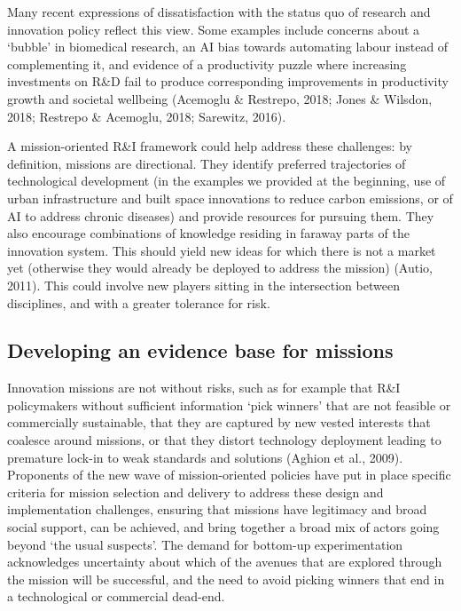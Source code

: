 \documentclass[11pt]{article}
\begin{document}
Many recent expressions of dissatisfaction with the status quo of research and innovation policy reflect this view. Some examples include concerns about a `bubble' in biomedical research, an AI bias towards automating labour instead of complementing it, and evidence of a productivity puzzle where increasing investments on R\&D fail to produce corresponding improvements in productivity growth and societal well\-being (Acemoglu \& Restrepo, 2018; Jones & Wilsdon, 2018; Restrepo & Acemoglu, 2018; Sarewitz, 2016).

A mission-oriented R&I framework could help address these challenges: by definition, missions are directional. They identify preferred trajectories of technological development (in the examples we provided at the beginning, use of urban infrastructure and built space innovations to reduce carbon emissions, or of AI to address chronic diseases) and provide resources for pursuing them. They also encourage combinations of knowledge residing in faraway parts of the innovation system. This should yield new ideas for which there is not a market yet (otherwise they would already be deployed to address the mission) (Autio, 2011). This could involve new players sitting in the intersection between disciplines, and with a greater tolerance for risk. 

\subsection{Developing an evidence base for missions}

Innovation missions are not without risks, such as for example that R\&I policymakers without sufficient information `pick winners’ that are not feasible or commercially sustainable, that they are captured by new vested interests that coalesce around missions, or that they distort technology deployment leading to premature lock-in to weak standards and solutions (Aghion et al., 2009). Proponents of the new wave of mission-oriented policies have put in place specific criteria for mission selection and delivery to address these design and implementation challenges, ensuring that missions have legitimacy and broad social support, can be achieved, and bring together a broad mix of actors going beyond `the usual suspects'. The demand for bottom-up experimentation acknowledges uncertainty about which of the avenues that are explored through the mission will be successful, and the need to avoid picking winners that end in a technological or commercial dead-end.  
\end{document}
